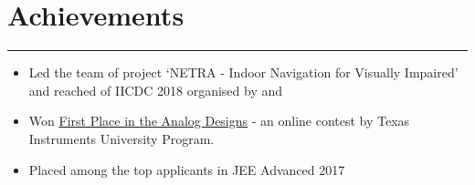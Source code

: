 \documentclass[]{resume}
\begin{document}
\begin{minipage}[t]{0.66\textwidth}
\vspace{-3ex}
\section{Achievements}
\vspace{-0.5em}
\noindent\rule{12.5cm}{0.4pt}
\vspace{-0.5em}
\begin{itemize}
  \item  Led the team of project ‘NETRA - Indoor Navigation for Visually Impaired’ and reached  of IICDC 2018 organised by  and 
  \vspace{-0.6em}
  \item Won {\href{https://drive.google.com/file/d/1tH7FADsvsnGYCFPdl-HvmgBuhCWdn90d/view}{\underline{First Place in the Analog Designs}}} - an online contest by Texas Instruments University Program.
  \vspace{-0.6em}
  \item Placed among the top  applicants in JEE Advanced 2017
\end{itemize}
\end{minipage} 
\end{document}
